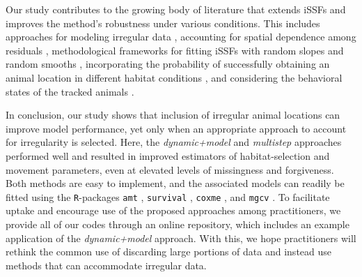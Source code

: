 \documentclass[../FinalThesis.tex]{subfiles}
\begin{document}
Our study contributes to the growing body of literature that extends iSSFs and
improves the method's robustness under various conditions. This includes
approaches for modeling irregular data \citep{Munden.2021, Eisaguirre.2024},
accounting for spatial dependence among residuals \citep{ArceGuillen.2023},
methodological frameworks for fitting iSSFs with random slopes \citep{Muff.2020}
and random smooths \citep{Klappstein.2024}, incorporating the probability of
successfully obtaining an animal location in different habitat conditions
\citep{Vales.2022}, and considering the behavioral states of the tracked animals
\citep{Klappstein.2023, Pohle.2023}.

In conclusion, our study shows that inclusion of irregular animal locations can
improve model performance, yet only when an appropriate approach to account for
irregularity is selected. Here, the \textit{dynamic+model} and
\textit{multistep} approaches performed well and resulted in improved estimators
of habitat-selection and movement parameters, even at elevated levels of
missingness and forgiveness. Both methods are easy to implement, and the
associated models can readily be fitted using the \texttt{R}-packages
\texttt{amt} \citep{Signer.2019}, \texttt{survival} \citep{Therneau.2024},
\texttt{coxme} \citep{Therneau.2024a}, and \texttt{mgcv} \citep{Wood.2011,
Wood.2017, Klappstein.2024}. To facilitate uptake and encourage use of the
proposed approaches among practitioners, we provide all of our codes through an
online repository, which includes an example application of the
\textit{dynamic+model} approach. With this, we hope practitioners will rethink
the common use of discarding large portions of data and instead use methods that
can accommodate irregular data.
\end{document}
